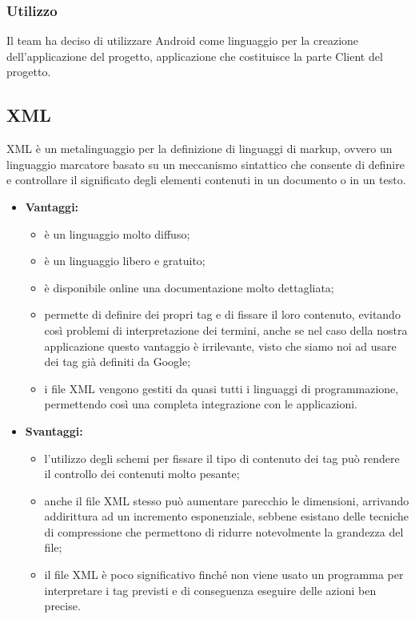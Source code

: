 	\subsubsection{Utilizzo}
	Il team ha deciso di utilizzare Android come linguaggio per la creazione dell'applicazione del progetto, applicazione che costituisce la parte Client del progetto.

\subsection{XML}

	XML è un metalinguaggio per la definizione di linguaggi di markup, ovvero un linguaggio marcatore basato su un meccanismo sintattico che consente di definire e controllare il significato degli elementi contenuti in un documento o in un testo.

	\begin{itemize}
		\item \textbf{Vantaggi:}
			\begin{itemize}
				\item è un linguaggio molto diffuso;
				\item è un linguaggio libero e gratuito;
				\item è disponibile online una documentazione molto dettagliata;
				\item permette di definire dei propri tag e di fissare il loro contenuto, evitando così problemi di interpretazione dei termini, anche se nel caso della nostra applicazione questo vantaggio è irrilevante, visto che siamo noi ad usare dei tag già definiti da Google;
				\item i file XML vengono gestiti da quasi tutti i linguaggi di programmazione, permettendo così una completa integrazione con le applicazioni.
			\end{itemize}
		\item \textbf{Svantaggi:}
			\begin{itemize}
				\item l'utilizzo degli schemi per fissare il tipo di contenuto dei tag può rendere il controllo dei contenuti molto pesante;
				\item anche il file XML stesso può aumentare parecchio le dimensioni, arrivando addirittura ad un incremento esponenziale, sebbene esistano delle tecniche di compressione che permettono di ridurre notevolmente la grandezza del file;
				\item il file XML è poco significativo finché non viene usato un programma per interpretare i tag previsti e di conseguenza eseguire delle azioni ben precise.
			\end{itemize}
	\end{itemize}
